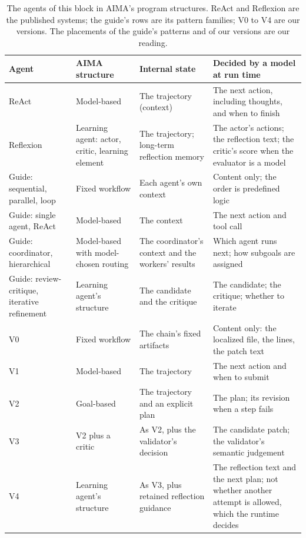 \begin{table}[htbp]
  \caption{The agents of this block in AIMA's program structures. ReAct and Reflexion are the
  published systems; the guide's rows are its pattern families; V0 to V4 are our versions. The
  placements of the guide's patterns and of our versions are our reading.}
  \label{tab:agents-placement}
  \small
  \begin{tabularx}{\linewidth}{>{\RaggedRight}p{2.9cm}>{\RaggedRight}p{2.9cm}XX}
    \toprule
    Agent & AIMA structure & Internal state & Decided by a model at run time \\
    \midrule
    ReAct & Model-based & The trajectory (context) & The next action, including thoughts, and when to finish \\
    Reflexion & Learning agent: actor, critic, learning element & The trajectory; long-term reflection memory & The actor's actions; the reflection text; the critic's score when the evaluator is a model \\
    Guide: sequential, parallel, loop & Fixed workflow & Each agent's own context & Content only; the order is predefined logic \\
    Guide: single agent, ReAct & Model-based & The context & The next action and tool call \\
    Guide: coordinator, hierarchical & Model-based with model-chosen routing & The coordinator's context and the workers' results & Which agent runs next; how subgoals are assigned \\
    Guide: review-critique, iterative refinement & Learning agent's structure & The candidate and the critique & The candidate; the critique; whether to iterate \\
    V0 & Fixed workflow & The chain's fixed artifacts & Content only: the localized file, the lines, the patch text \\
    V1 & Model-based & The trajectory & The next action and when to submit \\
    V2 & Goal-based & The trajectory and an explicit plan & The plan; its revision when a step fails \\
    V3 & V2 plus a critic & As V2, plus the validator's decision & The candidate patch; the validator's semantic judgement \\
    V4 & Learning agent's structure & As V3, plus retained reflection guidance & The reflection text and the next plan; not whether another attempt is allowed, which the runtime decides \\
    \bottomrule
  \end{tabularx}
\end{table}

